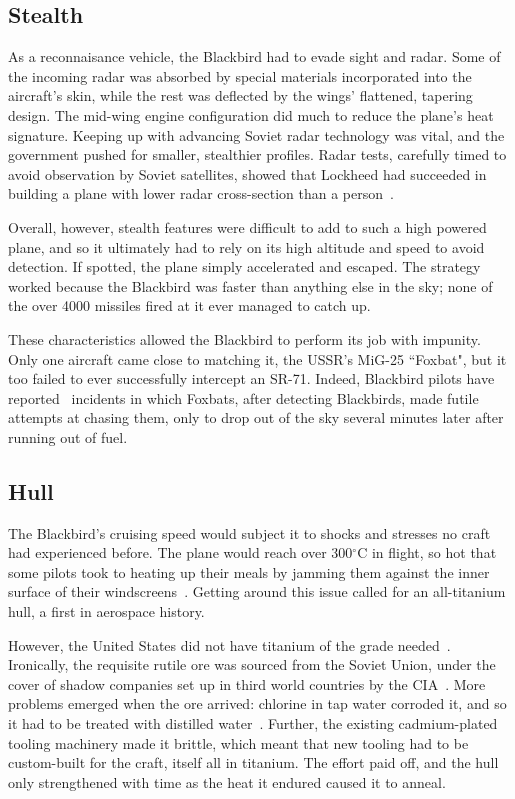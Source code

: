 \documentclass[12pt, draftclsnofoot, onecolumn]{IEEEtran}
\begin{document}
	\subsection{Stealth}
	
		As a reconnaisance vehicle, the Blackbird had to evade sight and radar. Some of the incoming radar was absorbed by special materials incorporated into the aircraft's skin, while the rest was deflected by the wings' flattened, tapering design. The mid-wing engine configuration did much to reduce the plane's heat signature. Keeping up with advancing Soviet radar technology was vital, and the government pushed for smaller, stealthier profiles. Radar tests, carefully timed to avoid observation by Soviet satellites, showed that Lockheed had succeeded in building a plane with lower radar cross-section than a person~\cite{creating}.
		
		Overall, however, stealth features were difficult to add to such a high powered plane, and so it ultimately had to rely on its high altitude and speed to avoid detection. If spotted, the plane simply accelerated and escaped. The strategy worked because the Blackbird was faster than anything else in the sky; none of the over 4000\cite{sleddriver} missiles fired at it ever managed to catch up.
		
		These characteristics allowed the Blackbird to perform its job with impunity. Only one aircraft came close to matching it, the USSR's MiG-25 ``Foxbat", but it too failed to ever successfully intercept an SR-71. Indeed, Blackbird pilots have reported~\cite{sleddriver} incidents in which Foxbats, after detecting Blackbirds, made futile attempts at chasing them, only to drop out of the sky several minutes later after running out of fuel.
		
	\subsection{Hull}
		The Blackbird's cruising speed would subject it to shocks and stresses no craft had experienced before. The plane would reach over 300$^\circ$C in flight, so hot that some pilots took to heating up their meals by jamming them against the inner surface of their windscreens~\cite{bbc}. Getting around this issue called for an all-titanium hull, a first in aerospace history.
		
		However, the United States did not have titanium of the grade needed~\cite{skunkworks}. Ironically, the requisite rutile ore was sourced from the Soviet Union, under the cover of shadow companies set up in third world countries by the CIA~\cite{bbc,skunkworks}. More problems emerged when the ore arrived: chlorine in tap water corroded it, and so it had to be treated with distilled water~\cite{skunkworks}. Further, the existing cadmium-plated tooling machinery made it brittle, which meant that new tooling had to be custom-built for the craft, itself all in titanium. The effort paid off, and the hull only strengthened with time as the heat it endured caused it to anneal.
		
\end{document}
